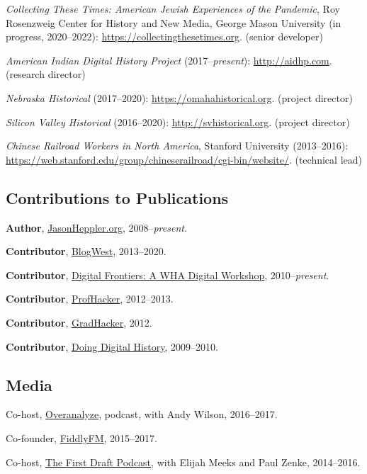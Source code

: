 \documentclass[10pt]{article}
\begin{document}
\textit{Collecting These Times: American Jewish Experiences of the Pandemic}, Roy Rosenzweig Center for History and New Media, George Mason University (in progress, 2020--2022): \url{https://collectingthesetimes.org}. (senior developer)

\textit{American Indian Digital History Project} (2017--\textit{present}): \url{http://aidhp.com}. (research director)

\textit{Nebraska Historical} (2017--2020): \url{https://omahahistorical.org}. (project director)

\textit{Silicon Valley Historical} (2016--2020): \url{http://svhistorical.org}. (project director)

\textit{Chinese Railroad Workers in North America}, Stanford University (2013--2016): \url{https://web.stanford.edu/group/chineserailroad/cgi-bin/website/}. (technical lead)

\subsection*{Contributions to Publications}

\textbf{Author}, \href{http://jasonheppler.org}{JasonHeppler.org}, 2008--\textit{present}.

\textbf{Contributor}, \href{http://blogwest.org/}{BlogWest}, 2013--2020.

\textbf{Contributor}, \href{http://whadigitalfrontiers.com/}{Digital Frontiers: A WHA Digital Workshop}, 2010--\textit{present}.

\textbf{Contributor}, \href{http://chronicle.com/blogs/profhacker/}{ProfHacker}, 2012--2013.

\textbf{Contributor}, \href{https://www.insidehighered.com/blogs/gradhacker}{GradHacker}, 2012.

\textbf{Contributor}, \href{http://digitalhistory.unl.edu/}{Doing Digital History}, 2009--2010.

\subsection{Media}

Co-host, \href{http://overanalyze.fireside.fm}{Overanalyze}, podcast, with Andy Wilson, 2016--2017.

Co-founder, \href{http://fiddly.fm}{FiddlyFM}, 2015--2017.

Co-host, \href{http://www.fiddly.fm/firstdraft/}{The First Draft Podcast}, with Elijah Meeks and Paul Zenke, 2014--2016.
\end{document}

